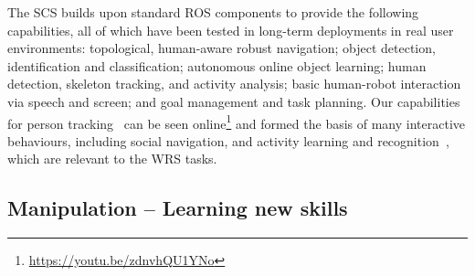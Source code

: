 \documentclass[runningheads,a4paper]{llncs}
\begin{document}
The SCS builds upon standard ROS components to provide the following capabilities, all of which have been tested in long-term deployments in real user environments: topological, human-aware robust navigation; object detection, identification and classification; autonomous online object learning; human detection, skeleton tracking, and activity analysis; basic human-robot interaction via speech and screen; and goal management and task planning. Our capabilities for person tracking~\cite{dondrup2015tracker} can be seen online\footnote{\url{https://youtu.be/zdnvhQU1YNo}} and formed the basis of many interactive behaviours, including social navigation, and activity learning and recognition~\cite{duckworth_aamas2016}, which are relevant to the WRS tasks. 


\subsection{Manipulation -- Learning new skills}
\end{document}
